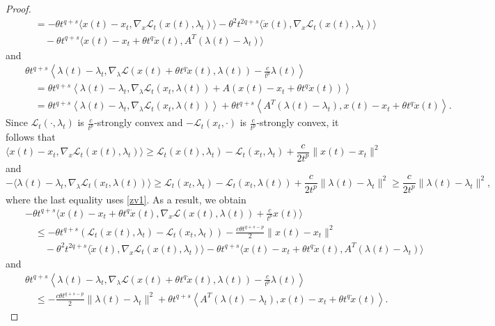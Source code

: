 \documentclass[review]{elsarticle}
\begin{document}
\begin{proof}
\begin{eqnarray*}
			&&\quad=-\theta t^{q+s}\langle x(t)-x_t, \nabla_{x}\mathcal{L}_{t}(x(t), \lambda_t)\rangle-\theta^2t^{2q+s}\langle\dot{x}(t), \nabla_{x}\mathcal{L}_{t}(x(t), \lambda_t)\rangle\\
			&&\qquad-\theta t^{q+s}\langle x(t)-x_t+\theta t^q\dot{x}(t), A^T(\lambda(t)-\lambda_t)\rangle
		\end{eqnarray*}
		and 
		\begin{eqnarray*}
			&&\theta t^{q+s}\left\langle \lambda(t)-\lambda_t, \nabla_{\lambda}\mathcal{L}(x(t)+\theta t^q\dot{x}(t), \lambda(t))-\frac{c}{t^p}\lambda(t)\right\rangle\\
			&&\quad=\theta t^{q+s}\left\langle \lambda(t)-\lambda_t, \nabla_{\lambda}\mathcal{L}_{t}(x_t, \lambda(t))+A\left(x(t)-x_t+\theta t^q\dot{x}(t)\right)\right\rangle\\
			&&\quad=\theta t^{q+s}\left\langle \lambda(t)-\lambda_t, \nabla_{\lambda}\mathcal{L}_{t}(x_t, \lambda(t))\right\rangle
			+\theta t^{q+s}\left\langle A^T(\lambda(t)-\lambda_t), x(t)-x_t+\theta t^q\dot{x}(t)\right\rangle.
		\end{eqnarray*}
		Since $\mathcal{L}_{t}(\cdot, \lambda_t)$ is $\frac{c}{t^p}$-strongly convex and $-\mathcal{L}_{t}(x_t,\cdot)$ is $\frac{c}{t^p}$-strongly convex, it follows that
		$$\langle x(t)-x_t, \nabla_{x}\mathcal{L}_{t}(x(t), \lambda_t)\rangle\geq\mathcal{L}_{t}(x(t), \lambda_t)-\mathcal{L}_{t}(x_t, \lambda_t)+\frac{c}{2t^p}\|x(t)-x_t\|^2$$
and
		$$-\langle \lambda(t)-\lambda_t, \nabla_{\lambda}\mathcal{L}_{t}(x_t, \lambda(t))\rangle\geq\mathcal{L}_{t}(x_t, \lambda_t)-\mathcal{L}_{t}(x_t, \lambda(t))+\frac{c}{2t^p}\|\lambda(t)-\lambda_t\|^2\geq\frac{c}{2t^p}\|\lambda(t)-\lambda_t\|^2,$$
		where the last equality uses \eqref{zv1}.
		 As a result, we obtain
		\begin{eqnarray}\label{yp1}
			&&-\theta t^{q+s}\langle x(t)-x_t+\theta t^q\dot{x}(t), \nabla_{x}\mathcal{L}(x(t), \lambda(t))+\frac{c}{t^p}x(t)\rangle\nonumber\\
			&&\quad\leq-\theta t^{q+s}\left(\mathcal{L}_{t}(x(t), \lambda_t)-\mathcal{L}_{t}(x_t, \lambda_t)\right)-\frac{c\theta t^{q+s-p}}{2}\|x(t)-x_t\|^2\nonumber\\
			&&\qquad-\theta^2t^{2q+s}\langle\dot{x}(t), \nabla_{x}\mathcal{L}_{t}(x(t), \lambda_t)\rangle
			-\theta t^{q+s}\langle x(t)-x_t+\theta t^q\dot{x}(t), A^T(\lambda(t)-\lambda_t)\rangle
		\end{eqnarray}
		and 
		\begin{eqnarray}\label{yp2}
			&&\theta t^{q+s}\left\langle \lambda(t)-\lambda_t, \nabla_{\lambda}\mathcal{L}(x(t)+\theta t^q\dot{x}(t), \lambda(t))-\frac{c}{t^p}\lambda(t)\right\rangle\nonumber\\
			&&\quad\leq-\frac{c\theta t^{q+s-p}}{2}\|\lambda(t)-\lambda_t\|^2
			+\theta t^{q+s}\left\langle A^T(\lambda(t)-\lambda_t), x(t)-x_t+\theta t^q\dot{x}(t)\right\rangle.
		\end{eqnarray}


\end{proof}
\end{document}
